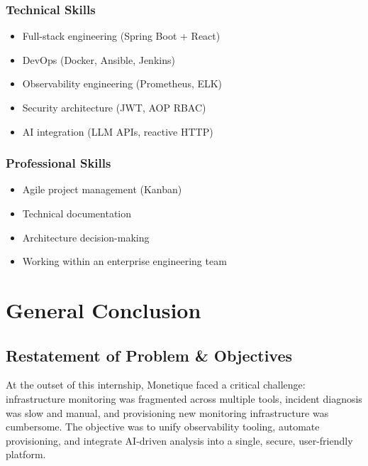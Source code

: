 \documentclass[12pt,a4paper]{report}
\begin{document}
\subsection{Technical Skills}
\begin{itemize}
    \item Full-stack engineering (Spring Boot + React)
    \item DevOps (Docker, Ansible, Jenkins)
    \item Observability engineering (Prometheus, ELK)
    \item Security architecture (JWT, AOP RBAC)
    \item AI integration (LLM APIs, reactive HTTP)
\end{itemize}

\subsection{Professional Skills}
\begin{itemize}
    \item Agile project management (Kanban)
    \item Technical documentation
    \item Architecture decision-making
    \item Working within an enterprise engineering team
\end{itemize}

\newpage

\chapter*{General Conclusion}

\section*{Restatement of Problem \& Objectives}

At the outset of this internship, Monetique faced a critical challenge: infrastructure monitoring was fragmented across multiple tools, incident diagnosis was slow and manual, and provisioning new monitoring infrastructure was cumbersome. The objective was to unify observability tooling, automate provisioning, and integrate AI-driven analysis into a single, secure, user-friendly platform.
\end{document}
